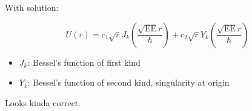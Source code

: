 \documentclass[12pt, a4paper]{article}
\begin{document}
With solution:

$$U(r) = c_1 \sqrt{r} J_k\left(\frac{\sqrt{\text{EE}} r}{\hbar}\right)+c_2 \sqrt{r} Y_k\left(\frac{\sqrt{\text{EE}} r}{\hbar}\right)$$

\begin{itemize}
\item $J_k$: Bessel's function of first kind
\item $Y_k$: Bessel's function of second kind, singularity at origin
\end{itemize}

Looks kinda correct.




\begin{comment}
Multiply all by $r^2$:

$$\left(
- \hbar^2 \left( r^2 \frac{\partial^2 R}{\partial r^2} + r \frac{\partial R}{\partial r} \right)
+ \hbar^2 k^2
+ \frac{1}{4} q^2 B^2 r^4
+ r^2 (p^2_z
- 2 m E
- q B \hbar k)
\right) R(r) = 0$$
\end{comment}

\begin{comment}

\subsubsection{Another gauge}
$$
A = \begin{pmatrix}
- B r \theta \\
0 \\
0
\end{pmatrix}
$$

$$\renewcommand\arraystretch{1.5}
(-i \hbar \nabla - q A) \psi =
\begin{pmatrix}
-i \hbar \frac{\partial \psi}{\partial r} + q B r \theta \psi \\
-i \hbar \frac{1}{r} \frac{\partial \psi}{\partial \theta}\\
-i \hbar \frac{\partial \psi}{\partial z}
\end{pmatrix}
$$


\begin{align*}
2 m H \psi
&= - \hbar^2 \frac{1}{r} \frac{\partial}{\partial r} \left( r \frac{\partial \psi}{\partial r}\right ) \\
&- \hbar^2 \frac{1}{r^2} \frac{\partial^2 \psi}{\partial \theta^2} \\
&- \hbar^2 \frac{\partial^2 \psi}{\partial z^2}
\end{align*}

Apparenly, this gauge is not nice one :(

\end{comment}
\end{document}
